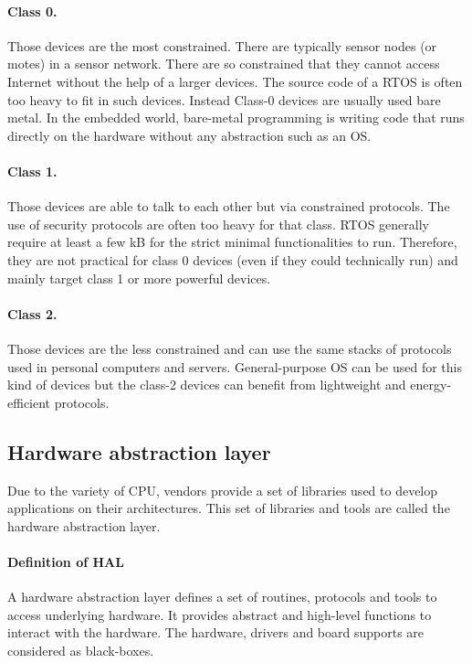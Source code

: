 \paragraph{Class 0.}
Those devices are the most constrained.
There are typically sensor nodes (or motes) in a sensor network.
There are so constrained that they cannot access Internet without the help of a larger devices.
The source code of a RTOS is often too heavy to fit in such devices.
Instead Class-0 devices are usually used bare metal.
In the embedded world, bare-metal programming is writing code that runs directly on the hardware without any abstraction such as an OS.

\paragraph{Class 1.}
Those devices are able to talk to each other but via constrained protocols.
The use of security protocols are often too heavy for that class.
RTOS generally require at least a few kB for the strict minimal functionalities to run.
Therefore, they are not practical for class 0 devices (even if they could technically run) and mainly target class 1 or more powerful devices.


\paragraph{Class 2.}
Those devices are the less constrained and can use the same stacks of protocols used in personal computers and servers.
General-purpose OS can be used for this kind of devices but the class-2 devices can benefit from lightweight and energy-efficient protocols.

\subsection{Hardware abstraction layer}

Due to the variety of CPU, vendors provide a set of libraries used to develop applications on their architectures.
This set of libraries and tools are called the hardware abstraction layer.

\paragraph{Definition of HAL}
A hardware abstraction layer defines a set of routines, protocols and tools to access underlying hardware.
It provides abstract and high-level functions to interact with the hardware.
The hardware, drivers and board supports are considered as black-boxes.

